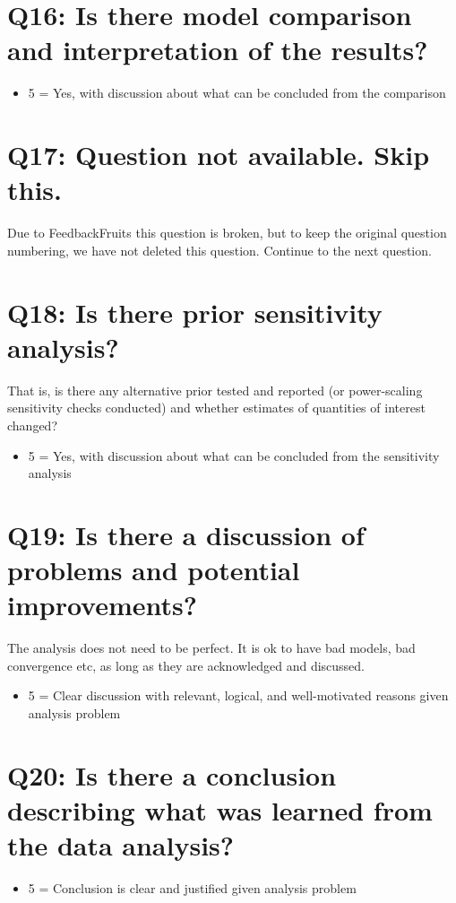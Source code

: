 \documentclass[11pt,a4paper]{article}
\begin{document}
\section{Q16: Is there model comparison and interpretation of the results?}
\begin{itemize}
    \item 5 = Yes, with discussion about what can be concluded from the comparison
\end{itemize}

\section{Q17: Question not available. Skip this.}
Due to FeedbackFruits this question is broken, but to keep the original question numbering, we have not deleted this question. Continue to the next question.

\section{Q18: Is there prior sensitivity analysis?}
That is, is there any alternative prior tested and reported (or power-scaling sensitivity checks conducted) and whether estimates of quantities of interest changed?
\begin{itemize}
    \item 5 = Yes, with discussion about what can be concluded from the sensitivity analysis
\end{itemize}

\section{Q19: Is there a discussion of problems and potential improvements?}
The analysis does not need to be perfect. It is ok to have bad models, bad convergence etc, as long as they are acknowledged and discussed.
\begin{itemize}
    \item 5 = Clear discussion with relevant, logical, and well-motivated reasons given analysis problem
\end{itemize}

\section{Q20: Is there a conclusion describing what was learned from the data analysis?}
\begin{itemize}
    \item 5 = Conclusion is clear and justified given analysis problem
\end{itemize}
\end{document}

